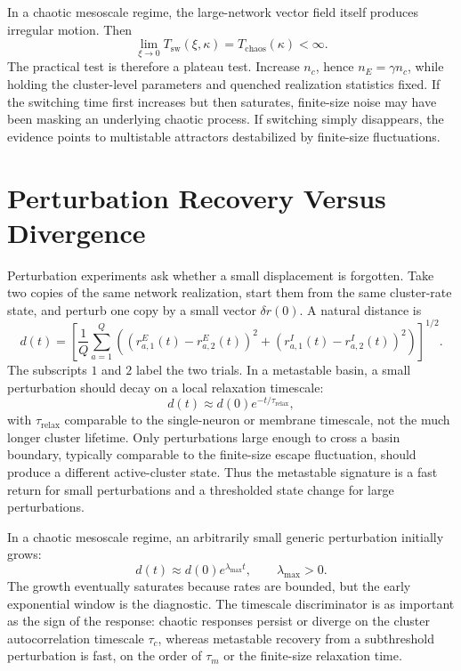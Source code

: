 In a chaotic mesoscale regime, the large-network vector field itself produces
irregular motion. Then
\begin{equation}
    \lim_{\xi\to 0}T_{\mathrm{sw}}(\xi,\kappa)
    =
    T_{\mathrm{chaos}}(\kappa)
    <\infty .
    \label{eq:ch09-plateau}
\end{equation}
The practical test is therefore a plateau test. Increase \(n_c\), hence
\(n_E=\gamma n_c\), while holding the cluster-level parameters and quenched
realization statistics fixed. If the switching time first increases but then
saturates, finite-size noise may have been masking an underlying chaotic
process. If switching simply disappears, the evidence points to multistable
attractors destabilized by finite-size fluctuations.

\section{Perturbation Recovery Versus Divergence}
\label{sec:ch09-perturbation-diagnostics}

Perturbation experiments ask whether a small displacement is forgotten. Take
two copies of the same network realization, start them from the same
cluster-rate state, and perturb one copy by a small vector \(\delta r(0)\). A
natural distance is
\begin{equation}
    d(t)
    =
    \left[
    \frac{1}{Q}
    \sum_{a=1}^{Q}
    \left(
    \left(r_{a,1}^E(t)-r_{a,2}^E(t)\right)^2
    +
    \left(r_{a,1}^I(t)-r_{a,2}^I(t)\right)^2
    \right)
    \right]^{1/2}.
    \label{eq:ch09-trajectory-distance}
\end{equation}
The subscripts \(1\) and \(2\) label the two trials. In a metastable basin, a
small perturbation should decay on a local relaxation timescale:
\begin{equation}
    d(t) \approx d(0)e^{-t/\tau_{\mathrm{relax}}},
    \label{eq:ch09-perturbation-decay}
\end{equation}
with \(\tau_{\mathrm{relax}}\) comparable to the single-neuron or membrane
timescale, not the much longer cluster lifetime. Only perturbations large
enough to cross a basin boundary, typically comparable to the finite-size
escape fluctuation, should produce a different active-cluster state. Thus the
metastable signature is a fast return for small perturbations and a thresholded
state change for large perturbations.

In a chaotic mesoscale regime, an arbitrarily small generic perturbation
initially grows:
\begin{equation}
    d(t) \approx d(0)e^{\lambda_{\max}t},
    \qquad \lambda_{\max}>0.
    \label{eq:ch09-perturbation-growth}
\end{equation}
The growth eventually saturates because rates are bounded, but the early
exponential window is the diagnostic. The timescale discriminator is as
important as the sign of the response: chaotic responses persist or diverge on
the cluster autocorrelation timescale \(\tau_c\), whereas metastable recovery
from a subthreshold perturbation is fast, on the order of \(\tau_m\) or the
finite-size relaxation time.


